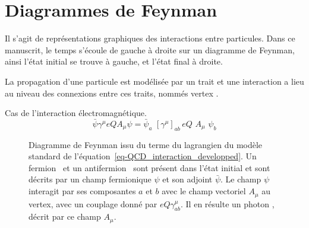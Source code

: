 \chapter{Diagrammes de Feynman}\label{annexe-fmf}


Il s'agit de représentations graphiques des interactions entre particules. Dans ce manuscrit, le temps s'écoule de gauche à droite sur un diagramme de Feynman, ainsi l'état initial se trouve à gauche, et l'état final à droite.

La propagation d'une particule est modélisée par un trait et une interaction a lieu au niveau des connexions entre ces traits, nommés \og vertex \fg.


Cas de l'interaction électromagnétique.
\begin{equation}
\bar{\psi}\gamma^\mu eQA_\mu \psi
=
\bar{\psi}_a \,\, [\gamma^\mu]_{ab} \, eQ \,\, A_\mu \,\, \psi_b
\label{eq-QCD_interaction_developped}
\end{equation}
\begin{figure}[h]
\centering
\vspace{\baselineskip}

\vspace{\baselineskip}
\caption[Diagramme de Feynman issu du terme~\eqref{eq-QCD_interaction_developped}.]{Diagramme de Feynman issu du terme du lagrangien du modèle standard de l'équation~\eqref{eq-QCD_interaction_developped}. Un fermion \fermion\ et un antifermion \antifermion\ sont présent dans l'état initial et sont décrits par un champ fermionique $\psi$ et son adjoint $\bar{\psi}$. Le champ $\psi$ interagit par ses composantes $a$ et $b$ avec le champ vectoriel $A_\mu$ au vertex, avec un couplage donné par $eQ\gamma^\mu_{ab}$. Il en résulte un photon \photon, décrit par ce champ $A_\mu$.}
\label{fig-fgraph-ff_Gamma1-large-annexeB}
\end{figure}